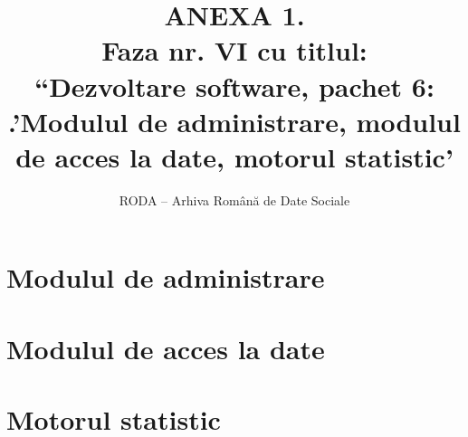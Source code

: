 \documentclass[11pt,twoside,romanian]{extbook}
\begin{document}
\fancyhead[RE,LO]{\thepage}


\title{ANEXA 1.\\
Faza nr. VI 
cu titlul:\\
``Dezvoltare software, pachet 6: .'Modulul de administrare, modulul de acces la date, motorul statistic'
}

\author{RODA -- Arhiva Rom\^{a}n\u{a} de Date Sociale}

\date{ }

\maketitle

\newpage
\thispagestyle{plain}
\tableofcontents{}
\setcounter{page}{1}

\chapter{Modulul de administrare}



\chapter{Modulul de acces la date}



\chapter{Motorul statistic}

 
\end{document}
